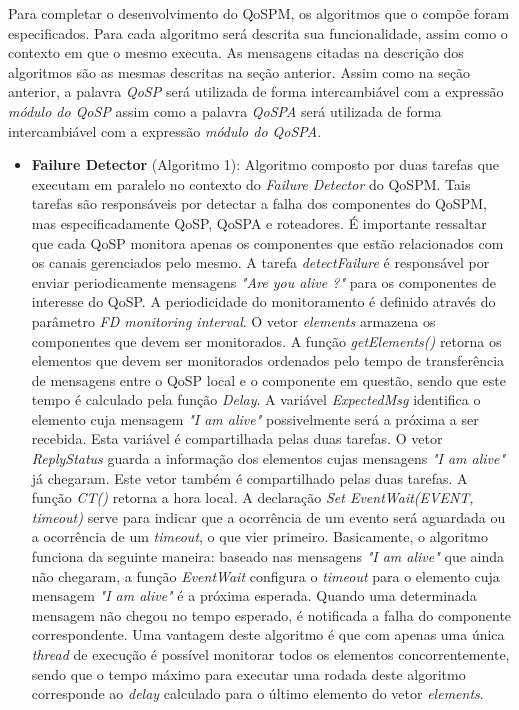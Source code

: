 	Para completar o desenvolvimento do QoSPM, os algoritmos que o compõe foram especificados. Para cada algoritmo será descrita sua funcionalidade, assim como o contexto em que o mesmo executa. As mensagens citadas na descrição dos algoritmos são as mesmas descritas na seção anterior. Assim como na seção anterior, a palavra \textit{QoSP} será utilizada de forma intercambiável com a expressão \textit{módulo do QoSP} assim como a palavra \textit{QoSPA} será utilizada de forma intercambiável com a expressão \textit{módulo do QoSPA}.


\begin{itemize}
\item \textbf{Failure Detector} (Algoritmo 1): Algoritmo composto por duas tarefas que executam em paralelo no contexto do \textit{Failure Detector} do QoSPM. Tais tarefas são responsáveis por detectar a falha dos componentes do QoSPM, mas especificadamente QoSP, QoSPA e roteadores. É importante ressaltar que cada QoSP monitora apenas os componentes que estão relacionados com os canais gerenciados pelo mesmo. A tarefa \textit{detectFailure} é responsável por enviar periodicamente mensagens \textit{"Are you alive ?"} para os componentes de interesse do QoSP. A periodicidade do monitoramento é definido através do parâmetro \textit{FD monitoring interval}. O vetor \textit{elements} armazena os componentes que devem ser monitorados. A função \textit{getElements()} retorna os elementos que devem ser monitorados ordenados pelo tempo de transferência de mensagens entre o QoSP local e o componente em questão, sendo que este tempo é calculado pela função \textit{Delay}. A variável \textit{ExpectedMsg} identifica o elemento cuja mensagem \textit{"I am alive"} possivelmente será a próxima a ser recebida. Esta variável é compartilhada pelas duas tarefas. O vetor \textit{ReplyStatus} guarda a informação dos elementos cujas mensagens \textit{"I am alive"} já chegaram. Este vetor também é compartilhado pelas duas tarefas. A função \textit{CT()} retorna a hora local. A declaração \textit{Set EventWait(EVENT, timeout)} serve para indicar que a ocorrência de um evento será aguardada ou a ocorrência de um \textit{timeout}, o que vier primeiro. Basicamente, o algoritmo funciona da seguinte maneira: baseado nas mensagens \textit{"I am alive"} que ainda não chegaram, a função \textit{EventWait} configura o \textit{timeout} para o elemento cuja mensagem \textit{"I am alive"} é a próxima esperada. Quando uma determinada mensagem não chegou no tempo esperado, é notificada a falha do componente correspondente. Uma vantagem deste algoritmo é que com apenas uma única \textit{thread} de execução é possível monitorar todos os elementos concorrentemente, sendo que o tempo máximo para executar uma rodada deste algoritmo corresponde ao \textit{delay} calculado para o último elemento do vetor \textit{elements}.


\end{itemize}
